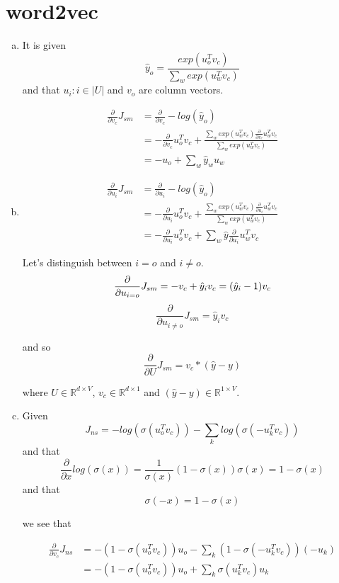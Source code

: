 \documentclass{article}
\newcommand{\dd}[2][]{\frac{\partial #1}{\partial #2}}
\newcommand{\R}[1]{\mathbb{R}^{#1}}
\begin{document}
\section{word2vec}

\begin{enumerate}[(a)]

\item It is given $$
\hat{y}_o = \frac{exp(u_o^T v_c)}{\sum_{w}exp(u_w^T v_c)}
$$ and that $u_i : i \in |U|$ and $v_o$ are column vectors.

\begin{align*} 
\dd{v_c}J_{sm} &= \dd{v_c} -log(\hat{y}_o) \\
&= -\dd{v_c}u_o^T v_c + \frac{\sum_{w}exp(u_w^T v_c)\dd{v_c}u_w^T v_c}{\sum_{w}exp(u_w^T v_c)} \\
&= -u_o + \sum_{w}\hat{y}_w u_w
\end{align*}

\item

\begin{align*} 
\dd{u_i}J_{sm} &= \dd{u_i} -log(\hat{y}_o) \\
&= -\dd{u_i}u_o^T v_c + \frac{\sum_{w}exp(u_w^T v_c)\dd{u_i}u_w^T v_c}{\sum_{w}exp(u_w^T v_c)} \\
&= -\dd{u_i}u_o^T v_c + \sum_{w} \hat{y} \dd{u_i}u_w^T v_c
\end{align*}

Let's distinguish between $i = o$ and $i \neq o$. $$
\dd{u_{i=o}}J_{sm} = -v_c + \hat{y}_i v_c \\
= (\hat{y}_i - 1)v_c
$$ $$
\dd{u_{i \neq o}}J_{sm} = \hat{y}_i v_c
$$

and so $$
\dd{U}J_{sm} = v_c * (\hat{y} - y)
$$

where $U \in \R{d \times V}$, $v_c \in \R{d \times 1}$ and $(\hat{y} - y) \in \R{1 \times V}$.

\item Given $$
J_{ns} = -log(\sigma(u_o^T v_c)) - \sum_k log(\sigma(-u_k^T v_c))
$$ and that $$
\dd{x} log(\sigma(x)) = \frac{1}{\sigma(x)}(1-\sigma(x))\sigma(x) = 1 - \sigma(x)
$$ and that $$
\sigma(-x) = 1 - \sigma(x)
$$

we see that 

\begin{align*} 
\dd{v_c}J_{ns} &= -(1 - \sigma(u_o^T v_c))u_o - \sum_k (1 - \sigma(-u_k^T v_c))(-u_k) \\ 
&= -(1 - \sigma(u_o^T v_c))u_o + \sum_k \sigma(u_k^T v_c)u_k
\end{align*}


\end{enumerate}
\end{document}
